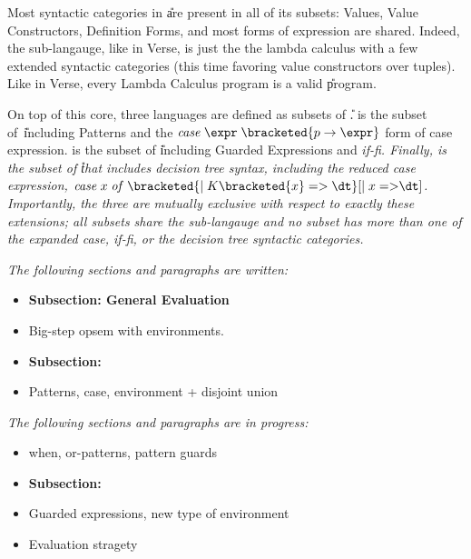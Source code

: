 \documentclass[manuscript,screen,review, 12pt]{acmart}
\begin{document}
Most syntactic categories in \U are present in all of its subsets: Values, Value
Constructors, Definition Forms, and most forms of expression are shared. Indeed,
the sub-langauge, like in Verse, is just the the lambda calculus with a few
extended syntactic categories (this time favoring value constructors over
tuples). Like in Verse, every Lambda Calculus program is a valid \U program. 

On top of this core, three languages are defined as subsets of \U. {\PPlus} is
the subset of~\U including Patterns and the $\mathit{case}\; \expr\;
\bracketed{p \rightarrow \expr}$ form of case expression. {\VMinus} is the
subset of \U including Guarded Expressions and \it{if-fi}. Finally, {\D} is the
subset of \U that includes decision tree syntax, including the reduced case
expression, $\mathit{case}\; x\; \mathit{of}\; \bracketed{\vert\;
K\bracketed{x}\; \mathit{=>}\; \dt} [\vert\; x\; \mathit{=>} \dt]$.
Importantly, the three are mutually exclusive with respect to exactly these
extensions; all subsets share the sub-langauge and no subset has more than one
of the expanded \it{case}, \it{if-fi}, or the decision tree syntactic
categories. 



\it{The following sections and paragraphs are written:}

\begin{itemize}
    \item \bf{Subsection: General Evaluation}
    \item Big-step opsem with environments. 
    \item \bf{Subsection: {\PPlus}}
    \item Patterns, case, environment + disjoint union 
\end{itemize}

\it{The following sections and paragraphs are in progress:}
\begin{itemize}
    \item when, or-patterns, pattern guards 
    \item \bf{Subsection: {\VMinus}}
    \item Guarded expressions, new type of environment
    \item Evaluation stragety 
\end{itemize}
\end{document}
